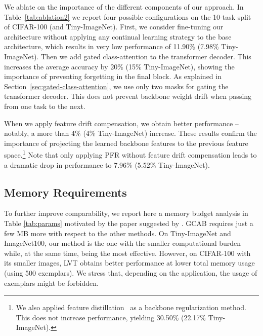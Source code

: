 \documentclass[twocolumn]{svjour3}          %
\begin{document}
We ablate on the importance of the different components of our approach. In Table~\ref{tab:ablation2} we report four possible configurations on the 10-task split of CIFAR-100 (and Tiny-ImageNet). First, we consider fine-tuning our architecture without applying any continual learning strategy to the base architecture, which results in very low performance of 11.90\% (7.98\% Tiny-ImageNet). Then we add gated class-attention to the transformer decoder. This increases the average accuracy by 20\% (15\% Tiny-ImageNet), showing the importance of preventing forgetting in the final block. 
As explained in Section~\ref{sec:gated-class-attention}, we use only two masks for gating the transformer decoder. This does not prevent backbone weight drift when passing from one task to the next. 

When we apply feature drift compensation, we obtain better performance -- notably, a more than 4\% (4\% Tiny-ImageNet) increase. These results confirm the importance of projecting the learned backbone features to the previous feature space.\footnote{We also applied feature distillation~\citep{hou2019learning} as a backbone regularization method. This does not increase performance, yielding 30.50\% (22.17\% Tiny-ImageNet).} Note that only applying PFR without feature drift compensation leads to a dramatic drop in performance to 7.96\% (5.52\% Tiny-ImageNet).


\subsection{Memory Requirements}
To further improve comparability, we report here a memory budget analysis in Table \ref{tab:params} motivated by the paper suggested by \citep{zhou2022model}.  GCAB requires just a few MB more with respect to the other methods. On Tiny-ImageNet and ImageNet100, our method is the one with the smaller computational burden while, at the same time, being the most effective. However, on CIFAR-100 with its smaller images, LVT obtains better performance at lower total memory usage (using 500 exemplars). We stress that, depending on the application, the usage of exemplars might be forbidden.
\end{document}
